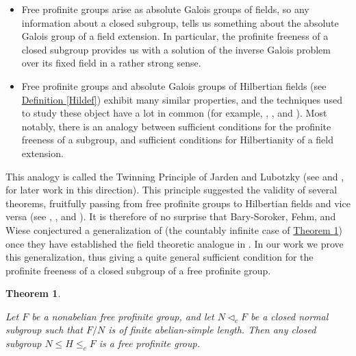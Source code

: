 \documentclass[12pt,a4paper]{article}
\newtheorem{theorem}{Theorem}[section]
\newcommand{\thmref}[1]{\hyperref[#1]{Theorem \ref*{#1}}}
\newcommand{\defref}[1]{\hyperref[#1]{Definition \ref*{#1}}}
\begin{document}
\begin{itemize}

\item Free profinite groups arise as absolute Galois groups of fields, so any information about a closed subgroup, tells us something about the absolute Galois group of a field extension. In particular, the profinite freeness of a closed subgroup provides us with a solution of the inverse Galois problem over its fixed field in a rather strong sense.

\item Free profinite groups and absolute Galois groups of Hilbertian fields (see \defref{Hildef}) exhibit many similar properties, and the techniques used to study these object have a lot in common (for example, \cite{Ja80}, \cite{Ja97}, and \cite{JL99}). Most notably, there is an analogy between sufficient conditions for the profinite freeness of a subgroup, and sufficient conditions for Hilbertianity of a field extension.

\end{itemize}

This analogy is called the Twinning Principle of Jarden and Lubotzky (see \cite{JL92} and \cite{Ha}, \cite{BP} for later work in this direction). This principle suggested the validity of several theorems, fruitfully passing from free profinite groups to Hilbertian fields and vice versa (see \cite{BS}, \cite{Ha}, and \cite{Ha99}). It is therefore of no surprise that Bary-Soroker, Fehm, and Wiese conjectured a generalization of \cite[Theorem 5.7]{BFW} (the countably infinite case of \thmref{FSLThm}) once they have established the field theoretic analogue in \cite[Theorem 3.2]{BFW}. In our work we prove this generalization, thus giving a quite general sufficient condition for the profinite freeness of a closed subgroup of a free profinite group.

\begin{theorem} \label{FSLThm}

Let $F$ be a nonabelian free profinite group, and let $N \lhd_c F$ be a closed normal subgroup such that $F/N$ is of finite abelian-simple length. Then any closed subgroup \mbox{$N \leq H \leq_c F$} is a free profinite group.

\end{theorem}
\end{document}
